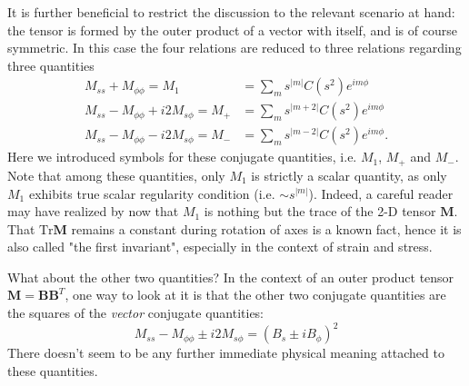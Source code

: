 It is further beneficial to restrict the discussion to the relevant scenario at hand: the tensor is formed by the outer product of a vector with itself, and is of course symmetric.
In this case the four relations are reduced to three relations regarding three quantities
\begin{equation}
    \begin{aligned}
        M_{ss} + M_{\phi\phi} = M_1 &= \sum_{m} s^{|m|} C(s^2) e^{im\phi} \\ 
        M_{ss} - M_{\phi\phi} + i 2M_{s\phi} = M_+ &= \sum_{m} s^{|m + 2|} C(s^2) e^{im\phi} \\ 
        M_{ss} - M_{\phi\phi} - i 2M_{s\phi} = M_- &= \sum_{m} s^{|m - 2|} C(s^2) e^{im\phi}.
    \end{aligned}
\end{equation}
Here we introduced symbols for these conjugate quantities, i.e. $M_1$, $M_+$ and $M_-$. 
Note that among these quantities, only $M_1$ is strictly a scalar quantity, as only $M_1$ exhibits true scalar regularity condition (i.e. $\sim s^{|m|}$). 
Indeed, a careful reader may have realized by now that $M_1$ is nothing but the trace of the 2-D tensor $\mathbf{M}$. 
That $\mathrm{Tr}\mathbf{M}$ remains a constant during rotation of axes is a known fact, hence it is also called "the first invariant", especially in the context of strain and stress.

What about the other two quantities? In the context of an outer product tensor $\mathbf{M} = \mathbf{B} \mathbf{B}^T$, one way to look at it is that the other two conjugate quantities are the squares of the \textit{vector} conjugate quantities:
\[
    M_{ss} - M_{\phi\phi} \pm i2 M_{s\phi} = \left(B_s \pm i B_\phi\right)^2
\]
There doesn't seem to be any further immediate physical meaning attached to these quantities.

